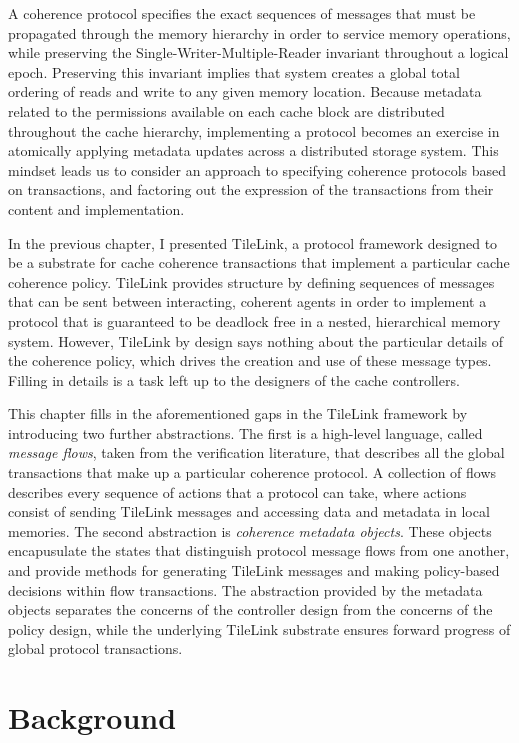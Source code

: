 A coherence protocol specifies the exact sequences of messages that must be propagated through the memory hierarchy in order to service memory operations,
while preserving the Single-Writer-Multiple-Reader invariant throughout a logical epoch.
Preserving this invariant implies that system creates a global total ordering of reads and write to any given memory location.
Because metadata related to the permissions available on each cache block are distributed throughout the cache hierarchy,
implementing a protocol becomes an exercise in atomically applying metadata updates across a distributed storage system.
This mindset leads us to consider an approach to specifying coherence protocols based on transactions,
and factoring out the expression of the transactions from their content and implementation.

In the previous chapter, I presented TileLink,
a protocol framework designed to be a substrate for cache coherence transactions that implement a particular cache coherence policy. 
TileLink provides structure by defining sequences of messages that can be sent between interacting, coherent agents in order
to implement a protocol that is guaranteed to be deadlock free in a nested, hierarchical memory system.
However, TileLink by design says nothing about the particular details of the coherence policy,
which drives the creation and use of these message types.
Filling in details is a task left up to the designers of the cache controllers.

This chapter fills in the aforementioned gaps in the TileLink framework by introducing two further abstractions.
The first is a high-level language,
called \emph{message flows},
taken from the verification literature, 
that describes all the global transactions that make up a particular coherence protocol.
A collection of flows describes every sequence of actions that a protocol can take,
where actions consist of sending TileLink messages and accessing  data and metadata in local memories.
The second abstraction is \emph{coherence metadata objects}.
These objects encapusulate the states that distinguish protocol message flows from one another,
and provide methods for generating TileLink messages and making policy-based decisions within flow transactions.
The abstraction provided by the metadata objects separates the concerns of the controller design from the concerns of the policy design, 
while the underlying TileLink substrate ensures forward progress of global protocol transactions.

\section{Background} 

